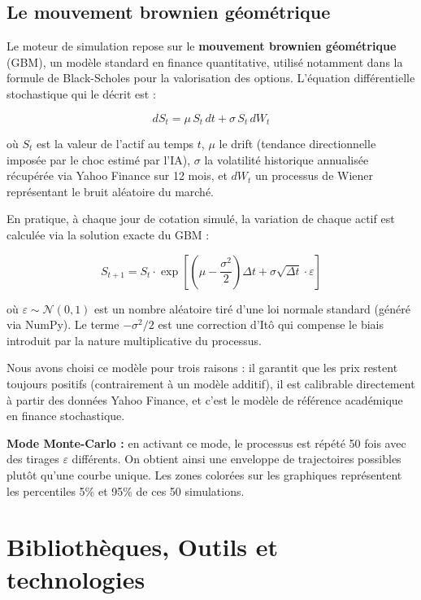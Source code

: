 \documentclass[a4paper, 12pt, twoside]{article}
\begin{document}
\subsection{Le mouvement brownien géométrique}

Le moteur de simulation repose sur le \textbf{mouvement brownien géométrique} (GBM),
un modèle standard en finance quantitative, utilisé notamment dans la formule de
Black-Scholes pour la valorisation des options. L'équation différentielle stochastique
qui le décrit est :

\begin{equation}
dS_t = \mu \, S_t \, dt + \sigma \, S_t \, dW_t
\end{equation}

où $S_t$ est la valeur de l'actif au temps $t$, $\mu$ le drift (tendance directionnelle
imposée par le choc estimé par l'IA), $\sigma$ la volatilité historique annualisée
récupérée via Yahoo Finance sur 12 mois, et $dW_t$ un processus de Wiener représentant
le bruit aléatoire du marché.

En pratique, à chaque jour de cotation simulé, la variation de chaque actif est
calculée via la solution exacte du GBM :

\begin{equation}
S_{t+1} = S_t \cdot \exp\!\left[\left(\mu - \frac{\sigma^2}{2}\right)\Delta t
+ \sigma \sqrt{\Delta t} \cdot \varepsilon\right]
\end{equation}

où $\varepsilon \sim \mathcal{N}(0,1)$ est un nombre aléatoire tiré d'une loi normale
standard (généré via NumPy). Le terme $-\sigma^2/2$ est une correction d'Itô qui
compense le biais introduit par la nature multiplicative du processus.

Nous avons choisi ce modèle pour trois raisons : il garantit que les prix restent
toujours positifs (contrairement à un modèle additif), il est calibrable directement
à partir des données Yahoo Finance, et c'est le modèle de référence académique en
finance stochastique.

\textbf{Mode Monte-Carlo :} en activant ce mode, le processus est répété 50 fois avec
des tirages $\varepsilon$ différents. On obtient ainsi une enveloppe de trajectoires
possibles plutôt qu'une courbe unique. Les zones colorées sur les graphiques
représentent les percentiles 5\% et 95\% de ces 50 simulations.

\newpage

\section{Bibliothèques, Outils et technologies}
\end{document}
